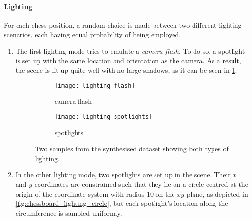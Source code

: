 \documentclass[../main.tex]{subfiles}
\begin{document}
\paragraph{Lighting}
For each chess position, a random choice is made between two different lighting scenarios, each having equal probability of being employed.
\begin{enumerate}
    \item The first lighting mode tries to emulate a \emph{camera flash}.
        To do so, a spotlight is set up with the same location and orientation as the camera. 
        As a result, the scene is lit up quite well with no large shadows, as it can be seen in \cref{fig:lighting_flash_example}.
        \begin{figure}
            \centering
            \begin{subfigure}[b]{0.47\textwidth}
                \centering
                \texttt{[image: lighting\_flash]}
                \caption{camera flash}
                \label{fig:lighting_flash_example}
            \end{subfigure}
            \hfill
            \begin{subfigure}[b]{0.47\textwidth}
                \centering
                \texttt{[image: lighting\_spotlights]}
                \caption{spotlights}
                \label{fig:lighting_spotlights_example}
            \end{subfigure}
            \caption{Two samples from the synthesised dataset showing both types of lighting.}
            \label{fig:lighting_examples}
        \end{figure}
    \item In the other lighting mode, two spotlights are set up in the scene. 
        Their $x$ and $y$ coordinates are constrained such that they lie on a circle centred at the origin of the coordinate system with radius 10 on the $xy$-plane, as depicted in \cref{fig:chessboard_lighting_circle}, but each spotlight's location along the circumference is sampled uniformly.
        \begin{figure}
            \centering
\end{figure}
\end{enumerate}
\end{document}
